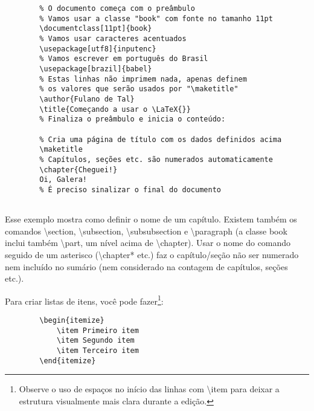 \begin{verbatim}
        % O documento começa com o preâmbulo
        % Vamos usar a classe "book" com fonte no tamanho 11pt
        \documentclass[11pt]{book}
        % Vamos usar caracteres acentuados
        \usepackage[utf8]{inputenc}
        % Vamos escrever em português do Brasil
        \usepackage[brazil]{babel}
        % Estas linhas não imprimem nada, apenas definem
        % os valores que serão usados por "\maketitle"
        \author{Fulano de Tal}
        \title{Começando a usar o \LaTeX{}}
        % Finaliza o preâmbulo e inicia o conteúdo:
        
        % Cria uma página de título com os dados definidos acima
        \maketitle
        % Capítulos, seções etc. são numerados automaticamente
        \chapter{Cheguei!}
        Oi, Galera!
        % É preciso sinalizar o final do documento
        
\end{verbatim}

Esse exemplo mostra como definir o nome de um capítulo. Existem também os
comandos \textsf{\textbackslash{}section}, \textsf{\textbackslash{}subsection},
\textsf{\textbackslash{}subsubsection} e \textsf{\textbackslash{}paragraph}
(a classe \textsf{book} inclui também \textsf{\textbackslash{}part}, um nível
acima de \textsf{\textbackslash{}chapter}). Usar o nome do comando seguido de
um asterisco (\textsf{\textbackslash{}chapter*} etc.) faz o capítulo/seção não
ser numerado nem incluído no sumário (nem considerado na contagem de capítulos,
seções etc.).

Para criar listas de itens, você pode fazer\footnote{Observe o uso de
espaços no início das linhas com \textsf{\textbackslash{}item} para deixar a
estrutura visualmente mais clara durante a edição.}:

\begin{verbatim}
        \begin{itemize}
            \item Primeiro item
            \item Segundo item
            \item Terceiro item
        \end{itemize}
\end{verbatim}

